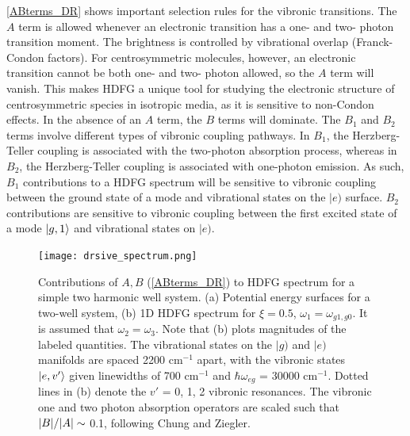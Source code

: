 \documentclass[aip, jcp, reprint, onecolumn]{revtex4-2}
\begin{document}
\autoref{ABterms_DR} shows important selection rules for the vibronic transitions.
The $A$ term is allowed whenever an electronic transition has a one- and two- photon transition moment.
The brightness is controlled by vibrational overlap (Franck-Condon factors).
For centrosymmetric molecules, however, an electronic transition cannot be both one- and two- photon allowed, so the $A$ term will vanish.\cite{Milojevich2013}
This makes HDFG a unique tool for studying the electronic structure of centrosymmetric species in isotropic media, as it is sensitive to non-Condon effects.\cite{Olson2018}
In the absence of an $A$ term, the $B$ terms will dominate.
The $B_1$ and $B_2$ terms involve different types of vibronic coupling pathways.
In $B_1$, the Herzberg-Teller coupling is associated with the two-photon absorption process, whereas in $B_2$, the Herzberg-Teller coupling is associated with one-photon emission.
As such, $B_1$ contributions to a HDFG spectrum will be sensitive to vibronic coupling between the ground state of a mode and vibrational states on the $|e)$ surface. 
$B_2$ contributions are sensitive to vibronic coupling between the first excited state of a mode $\ket{g,1}$ and vibrational states on $|e)$.

\begin{figure}[!htbp]
	\centering
	\texttt{[image: drsive\_spectrum.png]}
	\caption{Contributions of $A, B$ (\autoref{ABterms_DR}) to HDFG spectrum for a simple two harmonic well system.
		(a) Potential energy surfaces for a two-well system, (b) 1D HDFG spectrum for $\xi = 0.5$, $\omega_1 = \omega_{g1, g0}$. 
		It is assumed that $\omega_2 = \omega_3$.
		Note that (b) plots magnitudes of the labeled quantities.
		The vibrational states on the $|g)$ and $|e)$ manifolds are spaced 2200 cm$^{-1}$ apart, with the vibronic states $\ket{e,v'}$ given linewidths of 700 cm$^{-1}$ and $\hbar \omega_{eg}$ = 30000 cm$^{-1}$.
		Dotted lines in (b) denote the $v'$ = 0, 1, 2 vibronic resonances. 
		The vibronic one and two photon absorption operators are scaled such that $\abs{B}/\abs{A} \sim$ 0.1, following Chung and Ziegler. \cite{Ziegler1988}}
	\label{fig:doubres_spec}
\end{figure}
\end{document}
